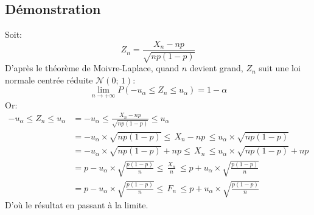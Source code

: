 \documentclass[12px]{article}
\begin{document}
	\subsection{Démonstration}
	Soit:
	\begin{displaymath}
		Z_n= \frac{X_n-np}{\sqrt{np(1-p)}}
	\end{displaymath}
	D'après le théorème de Moivre-Laplace, quand $n$ devient grand, $Z_n$ suit une loi normale centrée réduite $\mathcal{N}(0;\, 1):$\\
	\begin{displaymath}
		\lim\limits_{n\rightarrow +\infty}P(-u_\alpha\leq Z_n \leq u_\alpha) = 1-\alpha
	\end{displaymath}
	Or:
	\begin{align*}
		-u_\alpha\leq Z_n \leq u_\alpha
		&= -u_\alpha\leq \frac{X_n-np}{\sqrt{np(1-p)}} \leq u_\alpha\\
		&= -u_\alpha\times\sqrt{np(1-p)}\leq\, X_n-np\, \leq u_\alpha\times\sqrt{np(1-p)}\\
		&= -u_\alpha\times\sqrt{np(1-p)}+np\leq\, X_n\, \leq u_\alpha\times\sqrt{np(1-p)}+np\\
		&= p-u_\alpha\times\sqrt{ \frac{p(1-p)}{n} }\leq\, \frac{X_n}{n}\, \leq p+u_\alpha\times\sqrt{ \frac{p(1-p)}{n} }\\
		&= p-u_\alpha\times\sqrt{ \frac{p(1-p)}{n} }\leq\, F_n\, \leq p+u_\alpha\times\sqrt{ \frac{p(1-p)}{n} }
	\end{align*}
	D'où le résultat en passant à la limite.
	
\end{document}
